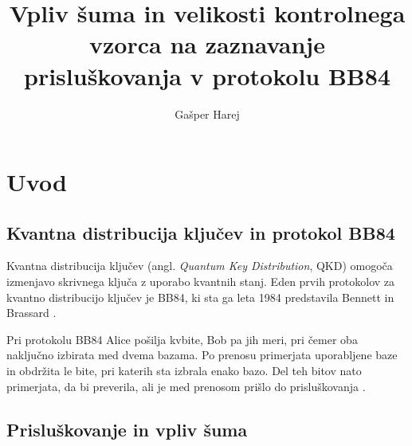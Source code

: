 \graphicspath{{Skupina22/img/}}

\title{Vpliv šuma in velikosti kontrolnega vzorca na zaznavanje prisluškovanja v protokolu BB84}
\author{Gašper Harej}
\maketitle




\section{Uvod}
\label{g22:sec:uvod}

\subsection{Kvantna distribucija ključev in protokol BB84}
\label{g22:sec:qkd-bb84}

Kvantna distribucija ključev (angl. \textit{Quantum
Key Distribution}, QKD) omogoča izmenjavo
skrivnega ključa z uporabo kvantnih stanj.
Eden prvih protokolov za kvantno distribucijo
ključev je BB84, ki sta ga leta 1984
predstavila Bennett in Brassard
\cite{g22:bennett1984bb84}.

Pri protokolu BB84 Alice pošilja kvbite,
Bob pa jih meri, pri čemer oba naključno
izbirata med dvema bazama. Po prenosu
primerjata uporabljene baze in obdržita
le bite, pri katerih sta izbrala enako bazo.
Del teh bitov nato primerjata, da bi preverila,
ali je med prenosom prišlo do prisluškovanja
\cite{g22:bennett1984bb84}.



\subsection{Prisluškovanje in vpliv šuma}
\label{g22:sec:prisluskovanje-sum}

